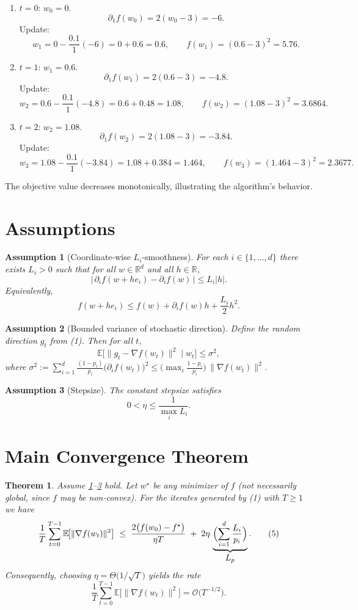 \documentclass{article}
\newtheorem{theorem}{Theorem}[section]
\newtheorem{assumption}{Assumption}[section]
\begin{document}
\begin{enumerate}[label=Iteration \arabic*:, leftmargin=*]
\item $t=0$: $w_0=0$.  
\[
\partial_1 f(w_0)=2(w_0-3)=-6.
\]
Update:
\[
w_1=0-\frac{0.1}{1}(-6)=0+0.6=0.6,\qquad 
f(w_1)=(0.6-3)^2=5.76.
\]
\item $t=1$: $w_1=0.6$.  
\[
\partial_1 f(w_1)=2(0.6-3)=-4.8.
\]
Update:
\[
w_2=0.6-\frac{0.1}{1}(-4.8)=0.6+0.48=1.08,\qquad 
f(w_2)=(1.08-3)^2=3.6864.
\]
\item $t=2$: $w_2=1.08$.  
\[
\partial_1 f(w_2)=2(1.08-3)=-3.84.
\]
Update:
\[
w_3=1.08-\frac{0.1}{1}(-3.84)=1.08+0.384=1.464,\qquad 
f(w_3)=(1.464-3)^2=2.3677.
\]
\end{enumerate}
The objective value decreases monotonically, illustrating the algorithm’s behavior.

\newpage
\section*{Assumptions}
\begin{assumption}[Coordinate‑wise $L_i$‑smoothness]\label{ass:smooth}
For each $i\in\{1,\dots ,d\}$ there exists $L_i>0$ such that for all $w\in\mathbb{R}^{d}$ and all $h\in\mathbb{R}$,
\[
\bigl|\,\partial_i f(w+he_i)-\partial_i f(w)\,\bigr|\le L_i|h|.
\tag{2}
\]
Equivalently,
\[
f(w+he_i)\le f(w)+\partial_i f(w)h+\frac{L_i}{2}h^{2}.
\tag{2'}
\]
\end{assumption}
\begin{assumption}[Bounded variance of stochastic direction]\label{ass:var}
Define the random direction $g_t$ from (1). Then for all $t$,
\[
\mathbb{E}\!\bigl[\|g_t-\nabla f(w_t)\|^{2}\mid w_t\bigr]
    \le \sigma^{2},
\tag{3}
\]
where $\sigma^{2}:=\sum_{i=1}^{d}\frac{(1-p_i)}{p_i}\bigl(\partial_i f(w_t)\bigr)^{2}\le
\bigl(\max_{i}\tfrac{1-p_i}{p_i}\bigr)\,\|\nabla f(w_t)\|^{2}$.
\end{assumption}
\begin{assumption}[Stepsize]\label{ass:stepsize}
The constant stepsize satisfies
\[
0<\eta\le \frac{1}{\max_{i}L_i}.
\tag{4}
\]
\end{assumption}

\section*{Main Convergence Theorem}
\begin{theorem}\label{thm:main}
Assume \ref{ass:smooth}–\ref{ass:stepsize} hold. Let $w^{\star}$ be any minimizer of $f$ (not necessarily global, since $f$ may be non‑convex). For the iterates generated by (1) with $T\ge 1$ we have
\[
\frac{1}{T}\sum_{t=0}^{T-1}
\mathbb{E}\!\bigl[\|\nabla f(w_t)\|^{2}\bigr]
\;\le\;
\frac{2\bigl(f(w_0)-f^{\star}\bigr)}{\eta T}
\;+\;
2\eta\,\underbrace{\Bigl(\sum_{i=1}^{d}\frac{L_i}{p_i}\Bigr)}_{\displaystyle L_{p}} .
\tag{5}
\]
Consequently, choosing $\eta = \Theta\!\bigl(1/\sqrt{T}\bigr)$ yields the rate
\[
\frac{1}{T}\sum_{t=0}^{T-1}
\mathbb{E}\!\bigl[\|\nabla f(w_t)\|^{2}\bigr]
= \mathcal{O}\!\bigl(T^{-1/2}\bigr).
\]
\end{theorem}
\end{document}
